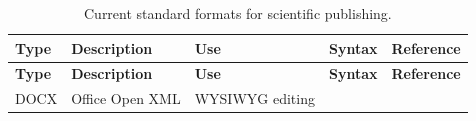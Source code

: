 \documentclass[10pt,fleqn]{wlpeerj}
\begin{document}
\begin{longtable}[c]{@{}lllll@{}}
\caption{Current standard formats for scientific
publishing.}\tabularnewline
\toprule
\begin{minipage}[b]{0.06\columnwidth}\raggedright\strut
\textbf{Type}
\strut\end{minipage} &
\begin{minipage}[b]{0.18\columnwidth}\raggedright\strut
\textbf{Description}
\strut\end{minipage} &
\begin{minipage}[b]{0.13\columnwidth}\raggedright\strut
\textbf{Use}
\strut\end{minipage} &
\begin{minipage}[b]{0.09\columnwidth}\raggedright\strut
\textbf{Syntax}
\strut\end{minipage} &
\begin{minipage}[b]{0.40\columnwidth}\raggedright\strut
\textbf{Reference}
\strut\end{minipage}\tabularnewline
\midrule
\endfirsthead
\toprule
\begin{minipage}[b]{0.06\columnwidth}\raggedright\strut
\textbf{Type}
\strut\end{minipage} &
\begin{minipage}[b]{0.18\columnwidth}\raggedright\strut
\textbf{Description}
\strut\end{minipage} &
\begin{minipage}[b]{0.13\columnwidth}\raggedright\strut
\textbf{Use}
\strut\end{minipage} &
\begin{minipage}[b]{0.09\columnwidth}\raggedright\strut
\textbf{Syntax}
\strut\end{minipage} &
\begin{minipage}[b]{0.40\columnwidth}\raggedright\strut
\textbf{Reference}
\strut\end{minipage}\tabularnewline
\midrule
\endhead
\begin{minipage}[t]{0.06\columnwidth}\raggedright\strut
DOCX
\strut\end{minipage} &
\begin{minipage}[t]{0.18\columnwidth}\raggedright\strut
Office Open XML
\strut\end{minipage} &
\begin{minipage}[t]{0.13\columnwidth}\raggedright\strut
WYSIWYG editing
\strut\end{minipage} &
\begin{minipage}[t]{0.09\columnwidth}\raggedright\strut

\end{minipage}
\end{longtable}
\end{document}
